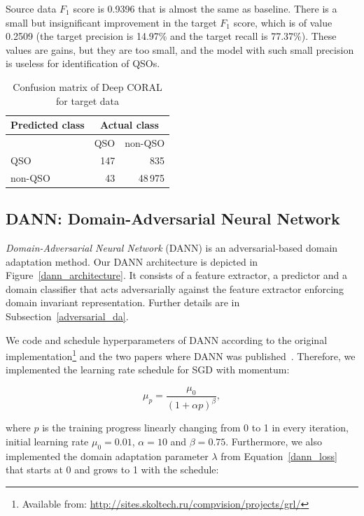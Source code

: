 Source data \(F_1\) score is 0.9396 that is almost the same as baseline.
There is a small but insignificant improvement in the target \(F_1\) score,
which is of value 0.2509
(the target precision is 14.97\% and the target recall is 77.37\%).
These values are gains, but they are too small,
and the model with such small precision is useless for identification of QSOs.

\begin{table}
\begin{center}
\begin{tabular}{|l|r|r|}
	\hline
	Predicted class & \multicolumn{2}{c|}{Actual class} \\
	\hline \hline
	& QSO & non-QSO \\ \hline
	QSO & 147 & 835 \\ \hline
	non-QSO & 43 & 48\,975 \\ \hline
\end{tabular}
\end{center}
\caption{Confusion matrix of Deep CORAL for target data}
\end{table}

\subsection{DANN: Domain-Adversarial Neural Network}

\textit{Domain-Adversarial Neural Network} (DANN) is an adversarial-based domain adaptation method.
Our DANN architecture is depicted in Figure~\ref{dann_architecture}.
It consists of a feature extractor, a predictor and a domain classifier
that acts adversarially against the feature extractor
enforcing domain invariant representation.
Further details are in Subsection~\ref{adversarial_da}.

We code and schedule hyperparameters of DANN according to the original
implementation\footnote{Available from: \url{http://sites.skoltech.ru/compvision/projects/grl/}}
and the two papers where DANN was published~\cite{ganin2015, ganin2016}.
Therefore, we implemented the learning rate schedule for SGD with momentum:

\begin{equation}
	\mu_p = \frac{\mu_0}{(1 + \alpha p)^\beta},
\end{equation}

where \(p\) is the training progress linearly changing from 0 to 1 in every iteration,
initial learning rate \(\mu_0 = 0.01\), \(\alpha = 10\) and \(\beta = 0.75\).
Furthermore, we also implemented the domain adaptation parameter \(\lambda\) from Equation~\ref{dann_loss} that starts at 0 and grows to 1 with the schedule:

